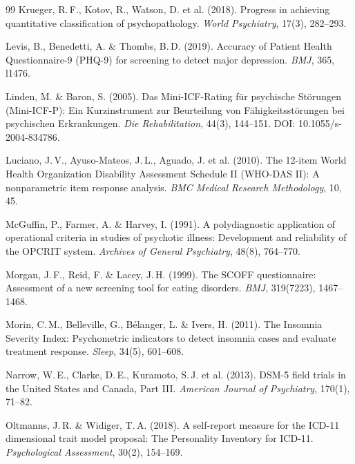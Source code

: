 \documentclass[11pt,a4paper]{article}
\begin{document}
\begin{thebibliography}{99}
Krueger, R.\,F., Kotov, R., Watson, D. et al. (2018).
\newblock Progress in achieving quantitative classification of psychopathology.
\newblock \textit{World Psychiatry}, 17(3), 282--293.

Levis, B., Benedetti, A. \& Thombs, B.\,D. (2019).
\newblock Accuracy of Patient Health Questionnaire-9 (PHQ-9) for screening to detect major depression.
\newblock \textit{BMJ}, 365, l1476.

Linden, M. \& Baron, S. (2005).
\newblock Das Mini-ICF-Rating f\"ur psychische St\"orungen (Mini-ICF-P): Ein Kurzinstrument zur Beurteilung von F\"ahigkeitsst\"orungen bei psychischen Erkrankungen.
\newblock \textit{Die Rehabilitation}, 44(3), 144--151. DOI: 10.1055/s-2004-834786.

Luciano, J.\,V., Ayuso-Mateos, J.\,L., Aguado, J. et al. (2010).
\newblock The 12-item World Health Organization Disability Assessment Schedule II (WHO-DAS II): A nonparametric item response analysis.
\newblock \textit{BMC Medical Research Methodology}, 10, 45.

McGuffin, P., Farmer, A. \& Harvey, I. (1991).
\newblock A polydiagnostic application of operational criteria in studies of psychotic illness: Development and reliability of the OPCRIT system.
\newblock \textit{Archives of General Psychiatry}, 48(8), 764--770.

Morgan, J.\,F., Reid, F. \& Lacey, J.\,H. (1999).
\newblock The SCOFF questionnaire: Assessment of a new screening tool for eating disorders.
\newblock \textit{BMJ}, 319(7223), 1467--1468.

Morin, C.\,M., Belleville, G., B\'elanger, L. \& Ivers, H. (2011).
\newblock The Insomnia Severity Index: Psychometric indicators to detect insomnia cases and evaluate treatment response.
\newblock \textit{Sleep}, 34(5), 601--608.

Narrow, W.\,E., Clarke, D.\,E., Kuramoto, S.\,J. et al. (2013).
\newblock DSM-5 field trials in the United States and Canada, Part III.
\newblock \textit{American Journal of Psychiatry}, 170(1), 71--82.

Oltmanns, J.\,R. \& Widiger, T.\,A. (2018).
\newblock A self-report measure for the ICD-11 dimensional trait model proposal: The Personality Inventory for ICD-11.
\newblock \textit{Psychological Assessment}, 30(2), 154--169.


\end{thebibliography}
\end{document}
